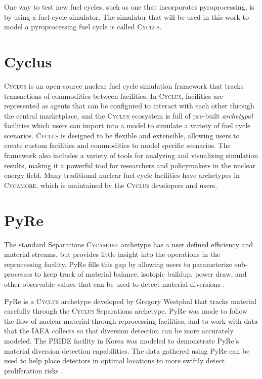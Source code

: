 \documentclass{anstrans}
\newcommand{\cycamore}{\textsc{Cycamore}\xspace}
\newcommand{\cyclus}{\textsc{Cyclus}\xspace}
\begin{document}
One way to test new fuel cycles, such as one that incorporates pyroprocessing, is by using a fuel cycle simulator. The simulator that will be used in this work to model a pyroprocessing fuel cycle is called \cyclus.

\section{Cyclus}
\label{sec:cyclus}
\cyclus \cite{huff_cyclus_intro_2016} is an open-source nuclear fuel cycle simulation framework that tracks transactions of commodities between facilities. In \cyclus, facilities are represented as agents that can be configured to interact with each other through the central marketplace, and the \cyclus ecosystem is full of pre-built \textit{archetypal} facilities which users can import into a model to simulate a variety of fuel cycle scenarios. \cyclus is designed to be flexible and extensible, allowing users to create custom facilities and commodities to model specific scenarios. The framework also includes a variety of tools for analyzing and visualizing simulation results, making it a powerful tool for researchers and policymakers in the nuclear energy field. Many traditional nuclear fuel cycle facilities have archetypes in \cycamore \cite{Carlsen_cycamore_2014}, which is maintained by the \cyclus developers and users.

\section{PyRe}
The standard Separations \cycamore archetype has a user defined efficiency and material streams, but provides little insight into the operations in the reprocessing facility. PyRe fills this gap by allowing users to parameterize sub-processes to keep track of material balance, isotopic buildup, power draw, and other observable values that can be used to detect material diversions \cite{westphal_modeling_2019}.

PyRe is a \cyclus archetype developed by Gregory Westphal that tracks material carefully through the \cyclus Separations archetype. PyRe was made to follow the flow of nuclear material through reprocessing facilities, and to work with data that the IAEA collects so that diversion detection can be more accurately modeled. The PRIDE facility in Korea was modeled to demonstrate PyRe’s material diversion detection capabilities. The data gathered using PyRe can be used to help place detectors in optimal locations to more swiftly detect proliferation risks \cite{westphal_pyre_2018}.
\end{document}
